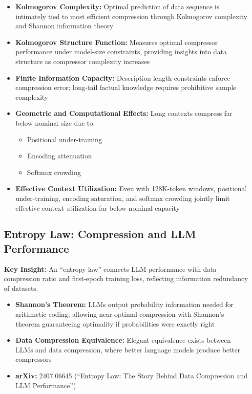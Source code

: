 \documentclass[11pt]{article}
\begin{document}
\begin{itemize}[leftmargin=*]
    \item \textbf{Kolmogorov Complexity:} Optimal prediction of data sequence is intimately tied to most efficient compression through Kolmogorov complexity and Shannon information theory
    \item \textbf{Kolmogorov Structure Function:} Measures optimal compressor performance under model-size constraints, providing insights into data structure as compressor complexity increases
    \item \textbf{Finite Information Capacity:} Description length constraints enforce compression error; long-tail factual knowledge requires prohibitive sample complexity
    \item \textbf{Geometric and Computational Effects:} Long contexts compress far below nominal size due to:
    \begin{itemize}
        \item Positional under-training
        \item Encoding attenuation
        \item Softmax crowding
    \end{itemize}
    \item \textbf{Effective Context Utilization:} Even with 128K-token windows, positional under-training, encoding saturation, and softmax crowding jointly limit effective context utilization far below nominal capacity
\end{itemize}

\subsection{Entropy Law: Compression and LLM Performance}

\textbf{Key Insight:} An ``entropy law'' connects LLM performance with data compression ratio and first-epoch training loss, reflecting information redundancy of datasets.

\begin{itemize}[leftmargin=*]
    \item \textbf{Shannon's Theorem:} LLMs output probability information needed for arithmetic coding, allowing near-optimal compression with Shannon's theorem guaranteeing optimality if probabilities were exactly right
    \item \textbf{Data Compression Equivalence:} Elegant equivalence exists between LLMs and data compression, where better language models produce better compressors
    \item \textbf{arXiv:} 2407.06645 (``Entropy Law: The Story Behind Data Compression and LLM Performance'')
\end{itemize}
\end{document}
